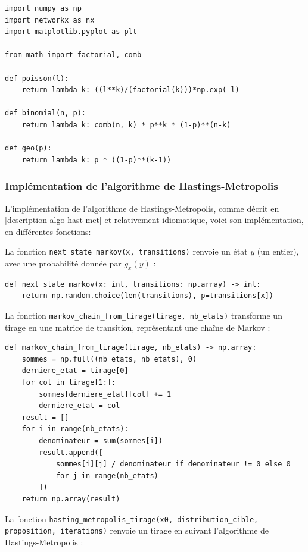 \documentclass{article}
\begin{document}
\begin{verbatim}
import numpy as np
import networkx as nx
import matplotlib.pyplot as plt

from math import factorial, comb

def poisson(l):
    return lambda k: ((l**k)/(factorial(k)))*np.exp(-l)

def binomial(n, p):
    return lambda k: comb(n, k) * p**k * (1-p)**(n-k)

def geo(p):
    return lambda k: p * ((1-p)**(k-1))
\end{verbatim}

\newpage
\subsubsection{Implémentation de l'algorithme de Hastings-Metropolis}

L’implémentation de l’algorithme de Hastings-Metropolis, comme décrit en \ref{description-algo-hast-met} et relativement idiomatique, voici son implémentation, en différentes fonctions: 

La fonction \texttt{next\_state\_markov(x, transitions)} renvoie un état $y$ (un entier), avec une probabilité donnée par $g_x(y)$ :

\begin{verbatim}
def next_state_markov(x: int, transitions: np.array) -> int:
    return np.random.choice(len(transitions), p=transitions[x])
\end{verbatim}

La fonction \texttt{markov\_chain\_from\_tirage(tirage, nb\_etats)} transforme un tirage en une matrice de transition, représentant une chaîne de Markov :

\begin{verbatim}
def markov_chain_from_tirage(tirage, nb_etats) -> np.array:
    sommes = np.full((nb_etats, nb_etats), 0)
    derniere_etat = tirage[0]
    for col in tirage[1:]:
        sommes[derniere_etat][col] += 1
        derniere_etat = col
    result = []
    for i in range(nb_etats):
        denominateur = sum(sommes[i])
        result.append([
            sommes[i][j] / denominateur if denominateur != 0 else 0 
            for j in range(nb_etats)
        ])
    return np.array(result)
\end{verbatim}

La fonction \texttt{hasting\_metropolis\_tirage(x0, distribution\_cible, proposition, iterations)} renvoie un tirage en suivant l’algorithme de Hastings-Metropolis :
\end{document}

